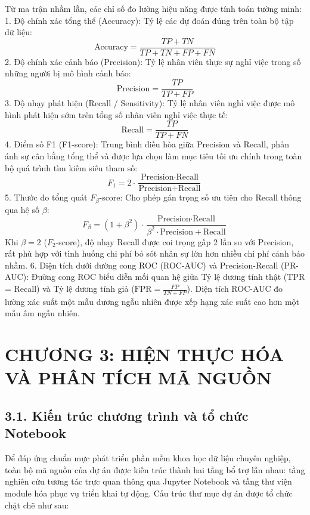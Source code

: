 \documentclass[12pt,a4paper]{article}
\begin{document}
Từ ma trận nhầm lẫn, các chỉ số đo lường hiệu năng được tính toán tường minh:
1. Độ chính xác tổng thể (Accuracy): Tỷ lệ các dự đoán đúng trên toàn bộ tập dữ liệu:
\begin{equation}
\text{Accuracy} = \frac{TP + TN}{TP + TN + FP + FN}
\end{equation}
2. Độ chính xác cảnh báo (Precision): Tỷ lệ nhân viên thực sự nghỉ việc trong số những người bị mô hình cảnh báo:
\begin{equation}
\text{Precision} = \frac{TP}{TP + FP}
\end{equation}
3. Độ nhạy phát hiện (Recall / Sensitivity): Tỷ lệ nhân viên nghỉ việc được mô hình phát hiện sớm trên tổng số nhân viên nghỉ việc thực tế:
\begin{equation}
\text{Recall} = \frac{TP}{TP + FN}
\end{equation}
4. Điểm số F1 (F1-score): Trung bình điều hòa giữa Precision và Recall, phản ánh sự cân bằng tổng thể và được lựa chọn làm mục tiêu tối ưu chính trong toàn bộ quá trình tìm kiếm siêu tham số:
\begin{equation}
F_1 = 2 \cdot \frac{\text{Precision} \cdot \text{Recall}}{\text{Precision} + \text{Recall}}
\end{equation}
5. Thước đo tổng quát $F_\beta$-score: Cho phép gán trọng số ưu tiên cho Recall thông qua hệ số $\beta$:
\begin{equation}
F_\beta = (1 + \beta^2) \cdot \frac{\text{Precision} \cdot \text{Recall}}{\beta^2 \cdot \text{Precision} + \text{Recall}}
\end{equation}
Khi $\beta=2$ ($F_2$-score), độ nhạy Recall được coi trọng gấp 2 lần so với Precision, rất phù hợp với tình huống chi phí bỏ sót nhân sự lớn hơn nhiều chi phí cảnh báo nhầm.
6. Diện tích dưới đường cong ROC (ROC-AUC) và Precision-Recall (PR-AUC): Đường cong ROC biểu diễn mối quan hệ giữa Tỷ lệ dương tính thật (TPR = Recall) và Tỷ lệ dương tính giả ($\text{FPR} = \frac{FP}{TN+FP}$). Diện tích ROC-AUC đo lường xác suất một mẫu dương ngẫu nhiên được xếp hạng xác suất cao hơn một mẫu âm ngẫu nhiên.


\newpage
\section{CHƯƠNG 3: HIỆN THỰC HÓA VÀ PHÂN TÍCH MÃ NGUỒN}

\subsection{3.1. Kiến trúc chương trình và tổ chức Notebook}
Để đáp ứng chuẩn mực phát triển phần mềm khoa học dữ liệu chuyên nghiệp, toàn bộ mã nguồn của dự án được kiến trúc thành hai tầng bổ trợ lẫn nhau: tầng nghiên cứu tương tác trực quan thông qua Jupyter Notebook và tầng thư viện module hóa phục vụ triển khai tự động. Cấu trúc thư mục dự án được tổ chức chặt chẽ như sau:
\end{document}
